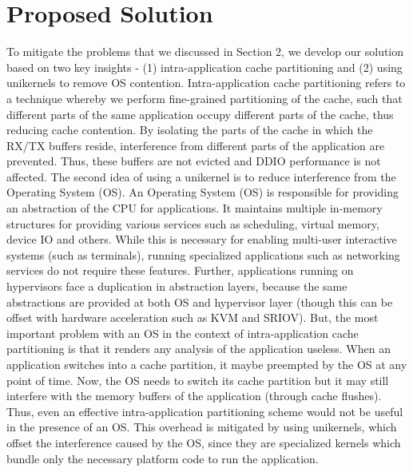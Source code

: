 \documentclass[sigconf,authorversion,noacm]{acmart}
\begin{document}
\section{Proposed Solution}

To mitigate the problems that we discussed in Section 2, we develop our solution
based on two key insights - (1) intra-application cache partitioning and (2)
using unikernels to remove OS contention. Intra-application cache partitioning
refers to a technique whereby we perform fine-grained partitioning of the cache,
such that different parts of the same application occupy different parts of the
cache, thus reducing cache contention. By isolating the parts of the cache in
which the RX/TX buffers reside, interference from different parts of the
application are prevented. Thus, these buffers are not evicted and DDIO
performance is not affected. The second idea of using a unikernel is to reduce
interference from the Operating System (OS). An Operating System (OS) is
responsible for providing an abstraction of the CPU for applications. It
maintains multiple in-memory structures for providing various services such as
scheduling, virtual memory, device IO and others. While this is necessary for
enabling multi-user interactive systems (such as terminals), running specialized
applications such as networking services do not require these features. Further,
applications running on hypervisors face a duplication in abstraction layers,
because the same abstractions are provided at both OS and hypervisor layer
(though this can be offset with hardware acceleration such as KVM and SRIOV).
But, the most important problem with an OS in the context of intra-application
cache partitioning is that it renders any analysis of the application useless.
When an application switches into a cache partition, it maybe preempted by the
OS at any point of time. Now, the OS needs to switch its cache partition but it
may still interfere with the memory buffers of the application (through cache
flushes). Thus, even an effective intra-application partitioning scheme would
not be useful in the presence of an OS. This overhead is mitigated by using
unikernels, which offset the interference caused by the OS, since they are
specialized kernels which bundle only the necessary platform code to run the
application.
\end{document}

